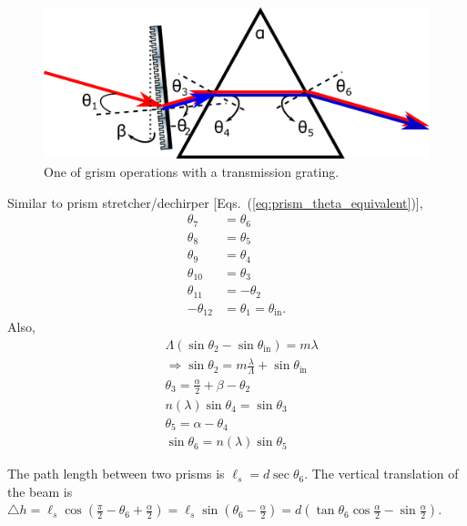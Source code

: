 \documentclass[12pt,hidelinks]{book}
\begin{document}
\begin{figure}[htbp]
\centering
\includegraphics[width=0.4\linewidth]{grism_enlarged v3.pdf}
\caption{One of grism operations with a transmission grating.}
\label{fig:grism_enlarged2}
\end{figure}

Similar to prism stretcher/dechirper [Eqs.~(\ref{eq:prism_theta_equivalent})],
\begingroup\allowdisplaybreaks
\begin{subequations}
\begin{align}
\theta_7 & =\theta_6 \\
\theta_8 & =\theta_5 \\
\theta_9 & =\theta_4 \\
\theta_{10} & =\theta_3 \\
\theta_{11} & =-\theta_2 \\
-\theta_{12} & =\theta_1=\theta_{\text{in}}.
\end{align}
\end{subequations}
\endgroup
Also,
\begin{subequations}
\begin{align}
& \Lambda\left(\sin\theta_2-\sin\theta_{\text{in}}\right)=m\lambda \nonumber \\
&\Rightarrow \sin\theta_2=m\frac{\lambda}{\Lambda}+\sin\theta_{\text{in}} \\[0.5em]
& \theta_3=\frac{\alpha}{2}+\beta-\theta_2 \label{eq:theta3_grism2} \\
& n(\lambda)\sin\theta_4=\sin\theta_3 \\
& \theta_5=\alpha-\theta_4 \\
& \sin\theta_6=n(\lambda)\sin\theta_5
\end{align}
\end{subequations}

The path length between two prisms is $\ell_s=d\sec\theta_6$. The vertical translation of the beam is $\triangle h=\ell_s\cos(\frac{\pi}{2}-\theta_6+\frac{\alpha}{2})=\ell_s\sin(\theta_6-\frac{\alpha}{2})=d\left(\tan\theta_6\cos\frac{\alpha}{2}-\sin\frac{\alpha}{2}\right)$.
\end{document}
